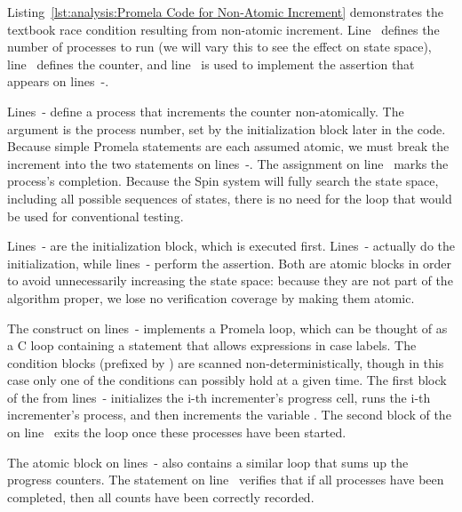 \begin{lineref}
Listing~\ref{lst:analysis:Promela Code for Non-Atomic Increment}
demonstrates the textbook race condition
resulting from non-atomic increment.
Line~ defines the number of processes to run (we will vary this
to see the effect on state space), line~ defines the counter,
and line~ is used to implement the assertion that appears on
lines~-.

Lines~- define a process that increments
the counter non-atomically.
The argument  is the process number, set by the initialization
block later in the code.
Because simple Promela statements are each assumed atomic, we must
break the increment into the two statements on
lines~-.
The assignment on line~ marks the process's completion.
Because the Spin system will fully search the state space, including
all possible sequences of states, there is no need for the loop
that would be used for conventional testing.

Lines~- are the initialization block,
which is executed first.
Lines~- actually do the initialization,
while lines~-
perform the assertion.
Both are atomic blocks in order to avoid unnecessarily increasing
the state space: because they are not part of the algorithm proper,
we lose no verification coverage by making them atomic.

The  construct on lines~-
implements a Promela loop,
which can be thought of as a C  loop containing a
 statement that allows expressions in case labels.
The condition blocks (prefixed by \co{::})
are scanned non-deterministically,
though in this case only one of the conditions can possibly hold at a given
time.
The first block of the  from
lines~-
initializes the i-th
incrementer's progress cell, runs the i-th incrementer's process, and
then increments the variable .
The second block of the  on
line~ exits the loop once
these processes have been started.

The atomic block on lines~- also contains
a similar 
loop that sums up the progress counters.
The  statement on line~ verifies that
if all processes
have been completed, then all counts have been correctly recorded.
\end{lineref}

